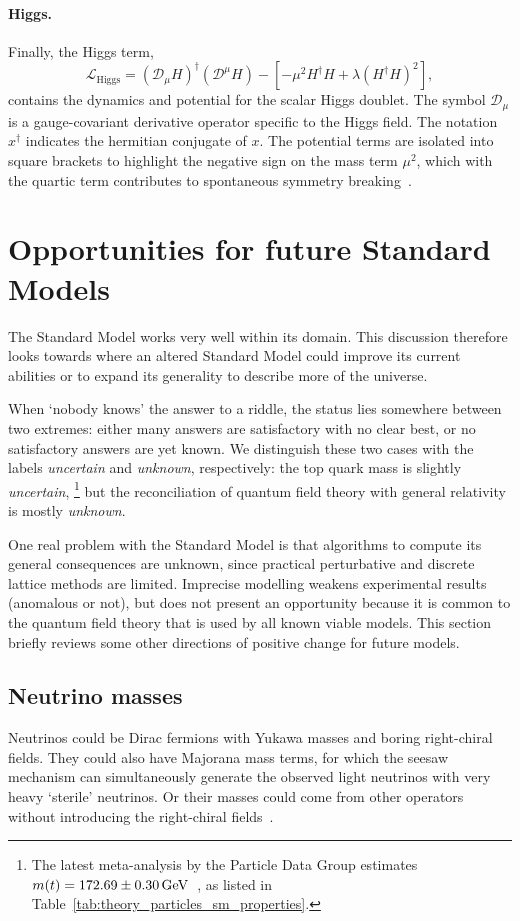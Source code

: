 \paragraph{Higgs.}
Finally, the Higgs term,
\begin{equation}
\mathcal{L}_\mathrm{Higgs} =
(\mathcal{D}_\mu H)^\dagger (\mathcal{D}^\mu H)
- \left[ -\mu^2 H^\dagger H + \lambda (H^\dagger H)^2 \right]
,
\end{equation}
contains the dynamics and potential for the scalar Higgs doublet.
The symbol $\mathcal{D}_\mu$ is a gauge-covariant derivative operator
specific to the Higgs field.
The notation $x^\dagger$ indicates the hermitian conjugate of $x$.
The potential terms are isolated into square brackets to highlight the negative
sign on the mass term $\mu^2$, which with the quartic term contributes to
spontaneous symmetry breaking~\cite{rubakov1999classical}.


\section{Opportunities for future Standard Models}
The Standard Model works very well within its domain.
This discussion therefore looks towards where an altered Standard Model could
improve its current abilities or to expand its generality to describe more of
the universe.

When `nobody knows' the answer to a riddle, the status lies somewhere between
two extremes:
either many answers are satisfactory with no clear best,
or no satisfactory answers are yet known.
We distinguish these two cases with the labels
\emph{uncertain} and \emph{unknown}, respectively:
the top quark mass is slightly \emph{uncertain},%
\footnote{%
The latest meta-analysis by the Particle Data Group estimates
$m(t) = 172.69 \pm 0.30\,\eV[G]$~\cite{pdg2022ynf}, as listed in
Table~\ref{tab:theory_particles_sm_properties}.
}
but the reconciliation of quantum field theory with general relativity is
mostly \emph{unknown}.

One real problem with the Standard Model is that algorithms to compute its
general consequences are unknown, since practical perturbative and discrete
lattice methods are limited.
Imprecise modelling weakens experimental results (anomalous or not),
but does not present an opportunity because it is common to the quantum field
theory that is used by all known viable models.
This section briefly reviews some other directions of positive change for
future models.


\subsection{Neutrino masses}
Neutrinos could be Dirac fermions with Yukawa masses and boring right-chiral
fields.
They could also have Majorana mass terms, for which the seesaw mechanism can
simultaneously generate the observed light neutrinos with very heavy `sterile'
neutrinos.
Or their masses could come from other operators without  introducing the
right-chiral fields~\cite{
thomson2013modern,
chala2021neutrino,
wells2020discovery
}.

